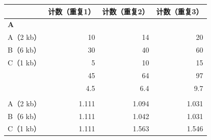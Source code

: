 \begin{table}[htbp]
\centering
{}
\label{tab:ch04a-03}
\begin{tabular}{lrrr}
\toprule
&计数（重复1）&计数（重复2）&计数（重复3）\\
\midrule
\multicolumn{4}{l}{\textbf{A}}\\
A（2 kb）&10&14&20\\
B（6 kb）&30&40&60\\
C（1 kb）&5&10&15\\
&45&64&97\\
&4.5&6.4&9.7\\
\addlinespace
\multicolumn{4}{l}{\textbf{B}}\\
A（2 kb）&1.111&1.094&1.031\\
B（6 kb）&1.111&1.042&1.031\\
C（1 kb）&1.111&1.563&1.546\\
\bottomrule
\end{tabular}
\end{table}
